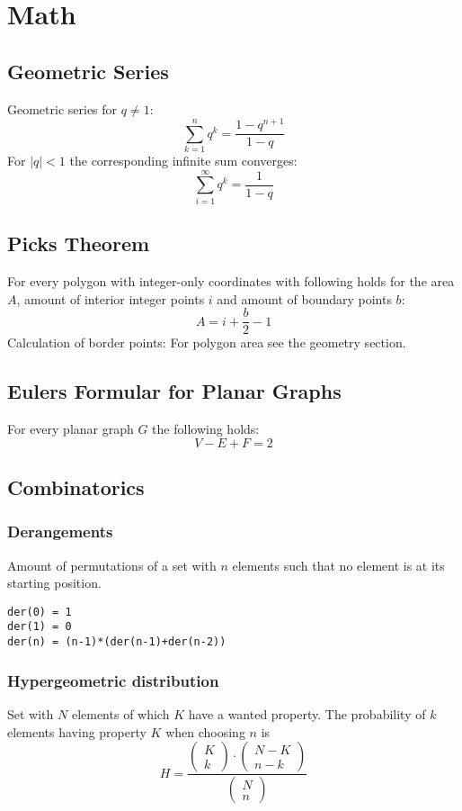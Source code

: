 \section{Math}

\subsection{Geometric Series}
Geometric series for $q \neq 1$:
\[
\sum\limits_{k=1}^n q^k = \frac{1-q^{n+1}}{1-q}
\]
For $\lvert q \rvert < 1$ the corresponding infinite sum converges:
\[
\sum_{i = 1}^{\infty} q^k = \frac{1}{1 - q}
\]

\subsection{Picks Theorem}
For every polygon with integer-only coordinates with following holds for the area $A$, amount of interior integer points $i$ and amount of boundary points $b$:
\[
A = i + \frac{b}{2} - 1
\]
Calculation of border points:
For polygon area see the geometry section.

\subsection{Eulers Formular for Planar Graphs}
For every planar graph $G$ the following holds:
\[
V - E + F = 2
\]

\subsection{Combinatorics}
\subsubsection{Derangements}
Amount of permutations of a set with $n$ elements such that no element is at its starting position.
\begin{lstlisting} 
der(0) = 1
der(1) = 0
der(n) = (n-1)*(der(n-1)+der(n-2))
\end{lstlisting}
\subsubsection{Hypergeometric distribution}
Set with $N$ elements of which $K$ have a wanted property. The probability of $k$ elements having property $K$ when choosing $n$ is
\[
H = \frac{
	\left(\begin{array}{c}K\\k\end{array}\right)
	\cdot 
	\left(\begin{array}{c}N-K\\n-k\end{array}\right)
}
{
	\left(\begin{array}{c}N\\n\end{array}\right)
}
\]
